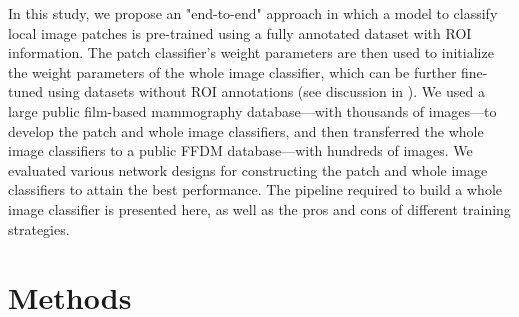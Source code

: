\documentclass[12pt,letterpaper]{article}
\begin{document}
In this study, we propose an "end-to-end" approach in which a model to classify local image patches is pre-trained using a fully annotated dataset with ROI information. The patch classifier's weight parameters are then used to initialize the weight parameters of the whole image classifier, which can be further fine-tuned using datasets without ROI annotations (see discussion in \cite{shen_breast_2017}). We used a large public film-based mammography database---with thousands of images---to develop the patch and whole image classifiers, and then transferred the whole image classifiers to a public FFDM database---with hundreds of images. We evaluated various network designs for constructing the patch and whole image classifiers to attain the best performance. The pipeline required to build a whole image classifier is presented here, as well as the pros and cons of different training strategies.

\section{Methods}
\end{document}
